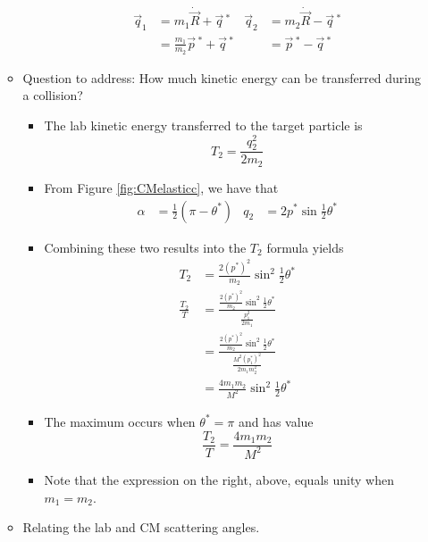 \documentclass[../notes.tex]{subfiles}
\begin{document}
\begin{itemize}
\begin{itemize}
\begin{itemize}
            \begin{align*}
                \vec{q}_1 &= m_1\dot{\vec{R}}+\vec{q}{\,}^*&
                    \vec{q}_2 &= m_2\dot{\vec{R}}-\vec{q}{\,}^*\\
                &= \frac{m_1}{m_2}\vec{p}{\,}^*+\vec{q}{\,}^*&
                    &= \vec{p}{\,}^*-\vec{q}{\,}^*
            \end{align*}
        \end{itemize}
        \item Question to address: How much kinetic energy can be transferred during a collision?
        \begin{itemize}
            \item The lab kinetic energy transferred to the target particle is
            \begin{equation*}
                T_2 = \frac{q_2^2}{2m_2}
            \end{equation*}
            \item From Figure \ref{fig:CMelasticc}, we have that
            \begin{align*}
                \alpha &= \frac{1}{2}(\pi-\theta^*)&
                q_2 &= 2p^*\sin\frac{1}{2}\theta^*
            \end{align*}
            \item Combining these two results into the $T_2$ formula yields
            \begin{align*}
                T_2 &= \frac{2(p^*)^2}{m_2}\sin^2\frac{1}{2}\theta^*\\
                \frac{T_2}{T} &= \frac{\frac{2(p^*)^2}{m_2}\sin^2\frac{1}{2}\theta^*}{\frac{p_1^2}{2m_1}}\\
                &= \frac{\frac{2(p^*)^2}{m_2}\sin^2\frac{1}{2}\theta^*}{\frac{M^2(p_1^*)^2}{2m_1m_2^2}}\\
                &= \frac{4m_1m_2}{M^2}\sin^2\frac{1}{2}\theta^*
            \end{align*}
            \item The maximum occurs when $\theta^*=\pi$ and has value
            \begin{equation*}
                \frac{T_2}{T} = \frac{4m_1m_2}{M^2}
            \end{equation*}
            \item Note that the expression on the right, above, equals unity when $m_1=m_2$.
        \end{itemize}
        \item Relating the lab and CM scattering angles.

\end{itemize}
\end{itemize}
\end{document}
